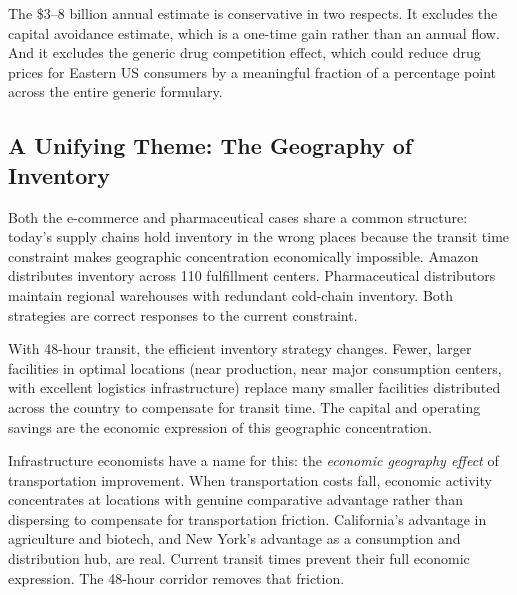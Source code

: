 The \$3--8 billion annual estimate is conservative in two respects. It excludes the
capital avoidance estimate, which is a one-time gain rather than an annual flow. And it
excludes the generic drug competition effect, which could reduce drug prices for Eastern
US consumers by a meaningful fraction of a percentage point across the entire generic
formulary.

\subsection{A Unifying Theme: The Geography of Inventory}

Both the e-commerce and pharmaceutical cases share a common structure: today's supply
chains hold inventory in the wrong places because the transit time constraint makes
geographic concentration economically impossible. Amazon distributes inventory across
110 fulfillment centers. Pharmaceutical distributors maintain regional warehouses with
redundant cold-chain inventory. Both strategies are correct responses to the
current constraint.

With 48-hour transit, the efficient inventory strategy changes. Fewer, larger facilities
in optimal locations (near production, near major consumption centers, with excellent
logistics infrastructure) replace many smaller facilities distributed across the
country to compensate for transit time. The capital and operating savings are the
economic expression of this geographic concentration.

Infrastructure economists have a name for this: the \textit{economic geography effect}
of transportation improvement. When transportation costs fall, economic activity
concentrates at locations with genuine comparative advantage rather than dispersing to
compensate for transportation friction. California's advantage in agriculture and biotech,
and New York's advantage as a consumption and distribution hub, are real. Current transit
times prevent their full economic expression. The 48-hour corridor removes that friction.
